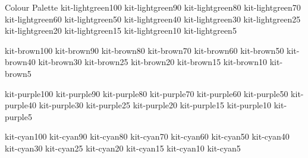 \documentclass[en]{sdqbeamer}
\begin{document}
\begin{frame}{Colour Palette}
	\colorbox{kit-lightgreen100}{kit-lightgreen100}
	\colorbox{kit-lightgreen90}{kit-lightgreen90}
	\colorbox{kit-lightgreen80}{kit-lightgreen80}
	\colorbox{kit-lightgreen70}{kit-lightgreen70}
	\colorbox{kit-lightgreen60}{kit-lightgreen60}
	\colorbox{kit-lightgreen50}{kit-lightgreen50}
	\colorbox{kit-lightgreen40}{kit-lightgreen40}
	\colorbox{kit-lightgreen30}{kit-lightgreen30}
	\colorbox{kit-lightgreen25}{kit-lightgreen25}
	\colorbox{kit-lightgreen20}{kit-lightgreen20}
	\colorbox{kit-lightgreen15}{kit-lightgreen15}
	\colorbox{kit-lightgreen10}{kit-lightgreen10}
	\colorbox{kit-lightgreen5}{kit-lightgreen5}

	\colorbox{kit-brown100}{kit-brown100}
	\colorbox{kit-brown90}{kit-brown90}
	\colorbox{kit-brown80}{kit-brown80}
	\colorbox{kit-brown70}{kit-brown70}
	\colorbox{kit-brown60}{kit-brown60}
	\colorbox{kit-brown50}{kit-brown50}
	\colorbox{kit-brown40}{kit-brown40}
	\colorbox{kit-brown30}{kit-brown30}
	\colorbox{kit-brown25}{kit-brown25}
	\colorbox{kit-brown20}{kit-brown20}
	\colorbox{kit-brown15}{kit-brown15}
	\colorbox{kit-brown10}{kit-brown10}
	\colorbox{kit-brown5}{kit-brown5}

	\colorbox{kit-purple100}{kit-purple100}
	\colorbox{kit-purple90}{kit-purple90}
	\colorbox{kit-purple80}{kit-purple80}
	\colorbox{kit-purple70}{kit-purple70}
	\colorbox{kit-purple60}{kit-purple60}
	\colorbox{kit-purple50}{kit-purple50}
	\colorbox{kit-purple40}{kit-purple40}
	\colorbox{kit-purple30}{kit-purple30}
	\colorbox{kit-purple25}{kit-purple25}
	\colorbox{kit-purple20}{kit-purple20}
	\colorbox{kit-purple15}{kit-purple15}
	\colorbox{kit-purple10}{kit-purple10}
	\colorbox{kit-purple5}{kit-purple5}

	\colorbox{kit-cyan100}{kit-cyan100}
	\colorbox{kit-cyan90}{kit-cyan90}
	\colorbox{kit-cyan80}{kit-cyan80}
	\colorbox{kit-cyan70}{kit-cyan70}
	\colorbox{kit-cyan60}{kit-cyan60}
	\colorbox{kit-cyan50}{kit-cyan50}
	\colorbox{kit-cyan40}{kit-cyan40}
	\colorbox{kit-cyan30}{kit-cyan30}
	\colorbox{kit-cyan25}{kit-cyan25}
	\colorbox{kit-cyan20}{kit-cyan20}
	\colorbox{kit-cyan15}{kit-cyan15}
	\colorbox{kit-cyan10}{kit-cyan10}
	\colorbox{kit-cyan5}{kit-cyan5}

\end{frame}
\backupend
\end{document}
